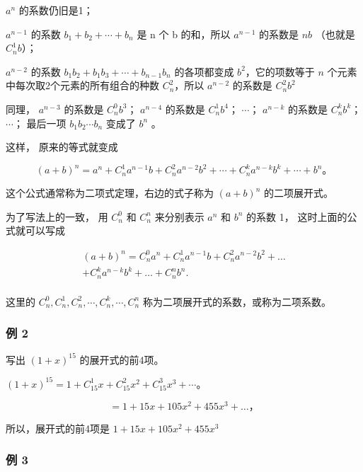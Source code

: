 \(a^n\) 的系数仍旧是1；

\(a^{n-1}\) 的系数 \(b_{1}+b_{2}+\cdots+b_{n}\) 是 n 个 b 的和，所以
\(a^{n-1}\) 的系数是 \(nb\) （也就是 \(C_{n}^{1}b\)）；

\(a^{n-2}\) 的系数 \(b_{1}b_{2} + b_{1}b_{3} + \cdots + b_{n-1}b_{n}\)
的各项都变成 \(b^{2}\)，它的项数等于 \(n\)
个元素中每次取2个元素的所有组合的种数 \(C_{n}^{2}\)，所以 \(a^{n - 2}\)
的系数是 \(C_n^2 b^2\)

同理， \(a^{n-3}\) 的系数是 \(C_{n}^{0}b^{3}\)； \(a^{n-4}\) 的系数是
\(C_{n}^{1}b^{4}\)； \(\cdots\)； \(a^{n-k}\) 的系数是
\(C_{n}^{k}b^{k}\)； \(\cdots\)； 最后一项 \(b_{1}b_{2}\cdots b_{n}\)
变成了 \(b^{n}\) 。

这样， 原来的等式就变成

\[
(a+b)^n=a^n+C_n^1a^{n-1}b+C_n^2a^{n-2}b^2+\cdots+C_n^ka^{n-k}b^k+\cdots+b^n\text{。}
\]

这个公式通常称为二项式定理，右边的式子称为 \((a+b)^{n}\) 的二项展开式。

为了写法上的一致， 用 \(C_n^0\) 和 \(C_n^n\) 来分别表示 \(a^n\) 和
\(b^n\) 的系数 1， 这时上面的公式就可以写成

\[
\begin{array}{l} (a + b) ^ {n} = C _ {n} ^ {0} a ^ {n} + C _ {n} ^ {1} a ^ {n - 1} b + C _ {n} ^ {2} a ^ {n - 2} b ^ {2} + \dots \\ + C _ {n} ^ {k} a ^ {n - k} b ^ {k} + \dots + C _ {n} ^ {n} b ^ {n}. \\ \end{array}
\]

这里的
\(C_{n}^{0}, C_{n}^{1}, C_{n}^{2}, \cdots, C_{n}^{k}, \cdots, C_{n}^{n}\)
称为二项展开式的系数，或称为二项系数。

\subsubsection{例 2}

写出 \((1 + x)^{15}\) 的展开式的前4项。

\((1+x)^{15}=1+C_{15}^{1}x+C_{15}^{2}x^2+C_{15}^{3}x^3+\cdots\)。

\[
= 1 + 15 x + 105 x ^ {2} + 455 x ^ {3} + \dots \text{，}
\]

所以，展开式的前4项是 \(1 + 15x + 105x^2 +455x^3\)

\subsubsection{例 3}

